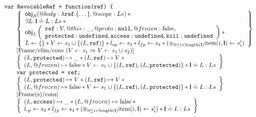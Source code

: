 \documentclass[a4paper]{article}
\begin{document}
%
\[
  \begin{array}{l}
    \js{var RevocableRef = function(ref) \{}\\
    \begin{array}{@{\qquad}l}
    \logic{
      \obj_R(@body: \lambda\js{ref}.\{\dots\} , @scope: Ls)
        \sep {} \\
        \exists L \st \ls \doteq L:Ls \sep {} \\
        \obj_L\left(
          \begin{array}{l}
            \js{ref}: V,@this: \_,@proto: \nil,@frozen: \false,\\
            \js{protected}: \und,\js{access}: \und,\js{kill}: \und %
          \end{array}
        \right) \sep {} \\
        L \bp \{\} \sep V \bp s_1 \cup \{(L,\js{ref})\} \sep
        \lop \bp s_3 \sep \lfp \bp s_4 \sep
        (\bigsep_{0\leq i<\length(\ls)} \lstitem(i,\ls) \bp s'_i)
    } \\
    \step{Frame/elim/cons ($V \bp s_1 \impl V \bp s_1 \cup s_2$)} \\
    \logic{
      (L, \js{protected}) \pointsto \_ \sep (L, \js{ref}) \pointsto V \sep {} \\
      (L, @frozen) \pointsto \false \sep
        V \bp s_1 \cup \{(L,\js{ref}), (L, \js{protected})\} \sep \ls\doteq{L:Ls}
    } \\
    \js{var protected = ref;} \\
    \logic{
      (L, \js{protected}) \pointsto V \sep (L, \js{ref}) \pointsto V \sep {} \\
      (L, @frozen) \pointsto \false \sep
        V \bp s_1 \cup \{(L,\js{ref}), (L, \js{protected})\}\sep \ls\doteq{L:Ls}
    } \\
    \step{Frame(s)/cons} \\
    \logic{
      (L, \js{access}) \pointsto \_ \sep
      (L,@frozen) \pointsto \false \sep {} \\
      \lop \bp s_3 \sep \lfp \bp s_4 \sep
        (\bigsep_{0\leq i<\length(\ls)} \lstitem(i,\ls) \bp s'_i)\sep \ls\doteq{L:Ls}
}
\end{array}
\end{array}\]
\end{document}
